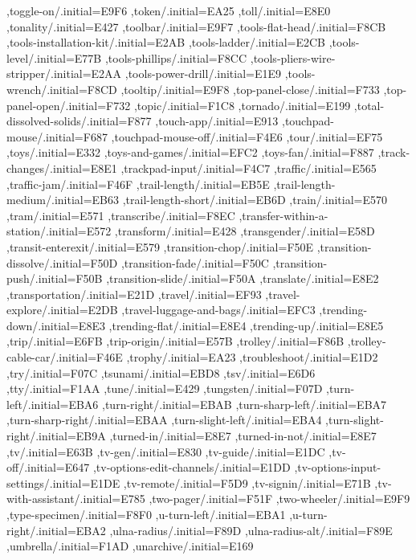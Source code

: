 { ,toggle-on/.initial=E9F6
 ,token/.initial=EA25
 ,toll/.initial=E8E0
 ,tonality/.initial=E427
 ,toolbar/.initial=E9F7
 ,tools-flat-head/.initial=F8CB
 ,tools-installation-kit/.initial=E2AB
 ,tools-ladder/.initial=E2CB
 ,tools-level/.initial=E77B
 ,tools-phillips/.initial=F8CC
 ,tools-pliers-wire-stripper/.initial=E2AA
 ,tools-power-drill/.initial=E1E9
 ,tools-wrench/.initial=F8CD
 ,tooltip/.initial=E9F8
 ,top-panel-close/.initial=F733
 ,top-panel-open/.initial=F732
 ,topic/.initial=F1C8
 ,tornado/.initial=E199
 ,total-dissolved-solids/.initial=F877
 ,touch-app/.initial=E913
 ,touchpad-mouse/.initial=F687
 ,touchpad-mouse-off/.initial=F4E6
 ,tour/.initial=EF75
 ,toys/.initial=E332
 ,toys-and-games/.initial=EFC2
 ,toys-fan/.initial=F887
 ,track-changes/.initial=E8E1
 ,trackpad-input/.initial=F4C7
 ,traffic/.initial=E565
 ,traffic-jam/.initial=F46F
 ,trail-length/.initial=EB5E
 ,trail-length-medium/.initial=EB63
 ,trail-length-short/.initial=EB6D
 ,train/.initial=E570
 ,tram/.initial=E571
 ,transcribe/.initial=F8EC
 ,transfer-within-a-station/.initial=E572
 ,transform/.initial=E428
 ,transgender/.initial=E58D
 ,transit-enterexit/.initial=E579
 ,transition-chop/.initial=F50E
 ,transition-dissolve/.initial=F50D
 ,transition-fade/.initial=F50C
 ,transition-push/.initial=F50B
 ,transition-slide/.initial=F50A
 ,translate/.initial=E8E2
 ,transportation/.initial=E21D
 ,travel/.initial=EF93
 ,travel-explore/.initial=E2DB
 ,travel-luggage-and-bags/.initial=EFC3
 ,trending-down/.initial=E8E3
 ,trending-flat/.initial=E8E4
 ,trending-up/.initial=E8E5
 ,trip/.initial=E6FB
 ,trip-origin/.initial=E57B
 ,trolley/.initial=F86B
 ,trolley-cable-car/.initial=F46E
 ,trophy/.initial=EA23
 ,troubleshoot/.initial=E1D2
 ,try/.initial=F07C
 ,tsunami/.initial=EBD8
 ,tsv/.initial=E6D6
 ,tty/.initial=F1AA
 ,tune/.initial=E429
 ,tungsten/.initial=F07D
 ,turn-left/.initial=EBA6
 ,turn-right/.initial=EBAB
 ,turn-sharp-left/.initial=EBA7
 ,turn-sharp-right/.initial=EBAA
 ,turn-slight-left/.initial=EBA4
 ,turn-slight-right/.initial=EB9A
 ,turned-in/.initial=E8E7
 ,turned-in-not/.initial=E8E7
 ,tv/.initial=E63B
 ,tv-gen/.initial=E830
 ,tv-guide/.initial=E1DC
 ,tv-off/.initial=E647
 ,tv-options-edit-channels/.initial=E1DD
 ,tv-options-input-settings/.initial=E1DE
 ,tv-remote/.initial=F5D9
 ,tv-signin/.initial=E71B
 ,tv-with-assistant/.initial=E785
 ,two-pager/.initial=F51F
 ,two-wheeler/.initial=E9F9
 ,type-specimen/.initial=F8F0
 ,u-turn-left/.initial=EBA1
 ,u-turn-right/.initial=EBA2
 ,ulna-radius/.initial=F89D
 ,ulna-radius-alt/.initial=F89E
 ,umbrella/.initial=F1AD
 ,unarchive/.initial=E169
}
